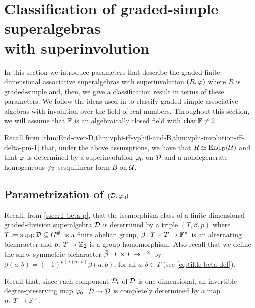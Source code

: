 
\section{Classification of graded-simple superalgebras\texorpdfstring{\\}{} with superinvolution}\label{sec:classification-grd-simple-with-sinv}

In this section we introduce parameters that describe the graded finite dimensional associative superalgebras with superinvolution $(R, \varphi)$ where $R$ is graded-simple and, then, we give a classification result in terms of these parameters. 
We follow the ideas used in \cite[Sections 2 and 3]{paper-adrian} to classify graded-simple associative algebras with involution over the field of real numbers. 
Throughout this section, we will assume that $\mathbb{F}$ is an algebraically closed field with $\operatorname{char} \mathbb{F} \neq 2$. 

Recall from \cref{thm:End-over-D,thm:vphi-iff-vphi0-and-B,thm:vphi-involution-iff-delta-pm-1}
that, under the above assumptions, we have that $R \simeq \operatorname{End}_{\mathcal{D}} (\mathcal U)$ and that $\varphi$ is determined by a superinvolution $\varphi_0$ on $\mathcal{D}$ and a nondegenerate homogeneous $\varphi_0$-sesquilinear form $B$ on $\mathcal U$.

\subsection{Parametrization of \texorpdfstring{$(\mathcal{D}, \varphi_0)$}{(D, phi0)}}\label{ssec:param-D-vphi}

Recall, from \cref{ssec:T-beta-p}, that the isomorphism class of a finite dimensional graded-division superalgebra $\mathcal{D}$ is determined by a triple $(T, \beta, p)$ where $T \coloneqq \operatorname{supp} \mathcal{D} \subseteq G^\#$ is a finite abelian group, $\beta\colon T\times T \to \mathbb{F}^\times$ is an alternating bicharacter and $p\colon T \to \mathbb{Z}_2$ is a group homomorphism. 
Also recall that we define the skew-symmetric bicharacter $\tilde\beta \colon T\times T \to \mathbb{F}^\times$ by $\tilde\beta (a,b) = (-1)^{p(a) p(b)} \beta(a, b)$, for all $a, b \in T$ (see \cref{eq:tilde-beta-def}). 

Recall that, since each component $\mathcal{D}_t$ of $\mathcal{D}$ is one-dimensional, an invertible degree-preserving map $\varphi_0\colon \mathcal{D} \to \mathcal{D}$ is completely determined by a map $\eta\colon T \to \mathbb{F}^\times$.

